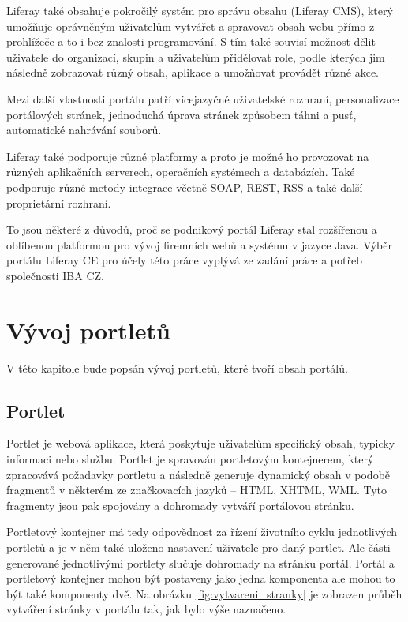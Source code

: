 \documentclass{fithesis}
\begin{document}
Liferay také obsahuje pokročilý systém pro správu obsahu (Liferay CMS), který umožňuje oprávněným uživatelům vytvářet a spravovat obsah webu přímo z prohlížeče a to i bez znalosti programování. S tím také souvisí možnost dělit uživatele do organizací, skupin a uživatelům přidělovat role, podle kterých jim následně zobrazovat různý obsah, aplikace a umožňovat provádět různé akce.

Mezi další vlastnosti portálu patří vícejazyčné uživatelské rozhraní, personalizace portálových stránek, jednoduchá úprava stránek způsobem táhni a pusť, automatické nahrávání souborů.

Liferay také podporuje různé platformy a proto je možné ho provozovat na různých aplikačních serverech, operačních systémech a databázích. Také podporuje různé metody integrace včetně SOAP, REST, RSS a také další proprietární rozhraní.\cite{liferay-features}

To jsou některé z důvodů, proč se podnikový portál Liferay stal rozšířenou a oblíbenou platformou pro vývoj firemních webů a systému v jazyce Java. Výběr portálu Liferay CE pro účely této práce vyplývá ze zadání práce a potřeb společnosti IBA CZ.


\chapter{Vývoj portletů}
V této kapitole bude popsán vývoj portletů, které tvoří obsah portálů.

\section{Portlet}
Portlet je webová aplikace, která poskytuje uživatelům specifický obsah, typicky informaci nebo službu. Portlet je spravován portletovým kontejnerem, který zpracovává požadavky portletu a následně generuje dynamický obsah v podobě fragmentů v některém ze značkovacích jazyků -- HTML, XHTML, WML. Tyto fragmenty jsou pak spojovány a dohromady vytváří portálovou stránku.

Portletový kontejner má tedy odpovědnost za řízení životního cyklu jednotlivých portletů a je v něm také uloženo nastavení uživatele pro daný portlet. Ale části generované jednotlivými portlety slučuje dohromady na stránku portál. Portál a portletový kontejner mohou být postaveny jako jedna komponenta ale mohou to být také komponenty dvě. Na obrázku \ref{fig:vytvareni_stranky} je zobrazen průběh vytváření stránky v portálu tak, jak bylo výše naznačeno.
\end{document}

